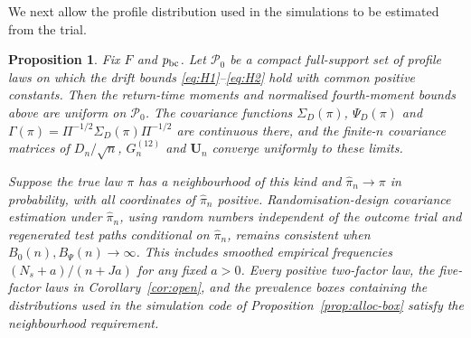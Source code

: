 \documentclass[12pt,a4paper]{article}
\newtheorem{proposition}{Proposition}
\theoremstyle{definition}
\theoremstyle{remark}\newtheorem{remark}{Remark}
\numberwithin{equation}{section}
\begin{document}
We next allow the profile distribution used in the simulations to be estimated from the trial.
\begin{proposition}\label{prop:alloc-plugin}
Fix $F$ and $p_{\rm bc}$. Let $\mathcal P_0$ be a compact full-support set of profile laws on which the drift bounds \eqref{eq:H1}--\eqref{eq:H2} hold with common positive constants. Then the return-time moments and normalised fourth-moment bounds above are uniform on $\mathcal P_0$. The covariance functions $\Sigma_D(\pi)$, $\Psi_D(\pi)$ and $\Gamma(\pi)=\Pi^{-1/2}\Sigma_D(\pi)\Pi^{-1/2}$ are continuous there, and the finite-$n$ covariance matrices of $D_n/\sqrt n$, $G_n^{(12)}$ and $\bm U_n$ converge uniformly to these limits.

Suppose the true law $\pi$ has a neighbourhood of this kind and $\widehat\pi_n\to\pi$ in probability, with all coordinates of $\widehat\pi_n$ positive. Randomisation-design covariance estimation under $\widehat\pi_n$, using random numbers independent of the outcome trial and regenerated test paths conditional on $\widehat\pi_n$, remains consistent when $B_0(n),B_\Psi(n)\to\infty$. This includes smoothed empirical frequencies $(N_s+a)/(n+Ja)$ for any fixed $a>0$. Every positive two-factor law, the five-factor laws in Corollary~\ref{cor:open}, and the prevalence boxes containing the distributions used in the simulation code of Proposition~\ref{prop:alloc-box} satisfy the neighbourhood requirement.
\end{proposition}
\end{document}
